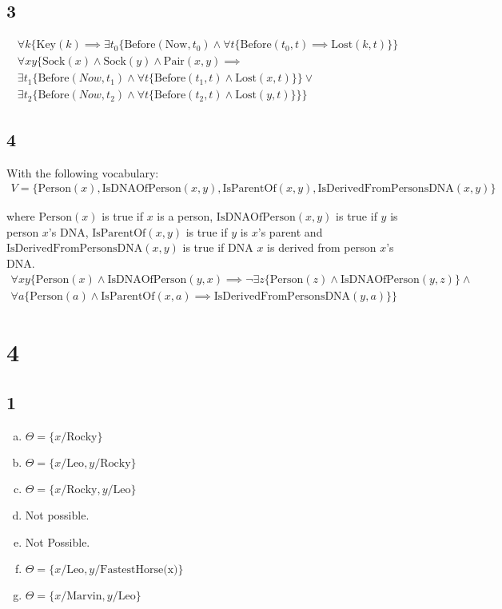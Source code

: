 \subsection*{3}
\begin{gather*}
    \forall k \{ \text{Key}(k) \implies \exists t_0 \{\text{Before}(\text{Now}, t_0) \wedge \forall t \{ \text{Before}(t_0, t) \implies \text{Lost}(k, t)\} \} \\
    \forall xy \{ \text{Sock}(x) \wedge \text{Sock}(y) \wedge \text{Pair}(x, y) \implies \\
    \exists t_1 \{ \text{Before}(Now, t_1) \wedge \forall t \{ \text{Before}(t_1, t) \wedge \text{Lost}(x, t)\} \} \vee \\
    \exists t_2 \{ \text{Before}(Now, t_2) \wedge \forall t \{ \text{Before}(t_2, t) \wedge \text{Lost}(y, t)\} \} \}
\end{gather*}

\subsection*{4}
With the following vocabulary:
\begin{gather*}
    V = \{\text{Person}(x), \text{IsDNAOfPerson}(x, y), \text{IsParentOf}(x, y), \text{IsDerivedFromPersonsDNA}(x, y)\}
\end{gather*}

where $\text{Person}(x)$ is true if $x$ is a person, $\text{IsDNAOfPerson}(x, y)$ is true if $y$ is person $x$'s DNA, $\text{IsParentOf}(x, y)$ is true if $y$ is $x$'s parent and $\text{IsDerivedFromPersonsDNA}(x, y)$ is true if DNA $x$ is derived from person $x$'s DNA.
\begin{gather*}
    \forall xy \{ \text{Person}(x) \wedge \text{IsDNAOfPerson}(y, x) \implies \neg \exists z \{ \text{Person}(z) \wedge \text{IsDNAOfPerson}(y, z) \} \wedge \\
    \forall a \{ \text{Person}(a) \wedge \text{IsParentOf}(x, a) \implies \text{IsDerivedFromPersonsDNA}(y, a) \}\}
\end{gather*}


\section*{4}
\subsection*{1}
\begin{enumerate}[a.]
    \item $\Theta = \{x/\text{Rocky}\}$
    \item $\Theta = \{x/\text{Leo}, y/\text{Rocky}\}$
    \item $\Theta = \{x/\text{Rocky}, y/\text{Leo}\}$
    \item Not possible.
    \item Not Possible.
    \item $\Theta = \{x/\text{Leo}, y/\text{FastestHorse(x)}\}$
    \item $\Theta = \{x/\text{Marvin}, y/\text{Leo}\}$
\end{enumerate}

